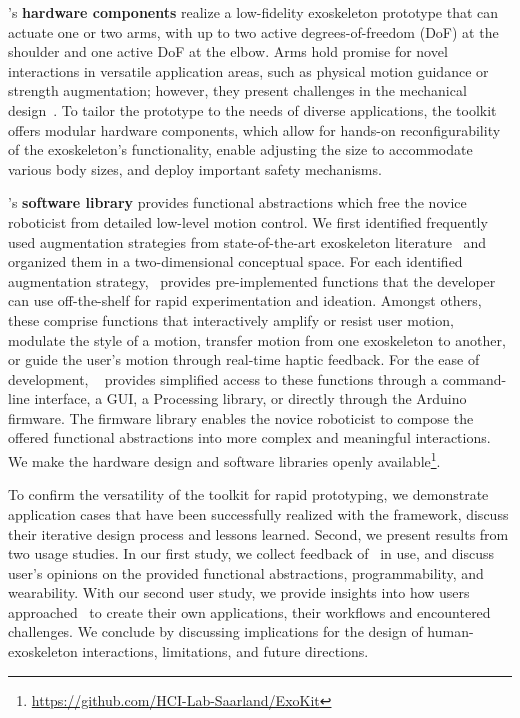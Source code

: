 \toolkit's \textbf{hardware components} realize a low-fidelity exoskeleton prototype that can actuate one or two arms, with up to two active degrees-of-freedom (DoF) at the shoulder and one active DoF at the elbow. 
Arms hold promise for novel interactions in versatile application areas, such as physical motion guidance or strength augmentation; however, they present challenges in the mechanical design~\cite{tiseni_2019}. 
To tailor the prototype to the needs of diverse applications, the toolkit offers modular hardware components, which allow for hands-on reconfigurability of the exoskeleton's functionality, enable adjusting the size to accommodate various body sizes, and deploy important safety mechanisms.

\toolkit's \textbf{software library} provides functional abstractions which free the novice roboticist from detailed low-level motion control. We first identified frequently used augmentation strategies from state-of-the-art exoskeleton literature~\cite{proietti_2016,gasperina_2021} and organized them in a two-dimensional conceptual space. 
For each identified augmentation strategy, \toolkit~provides pre-implemented functions that the developer can use off-the-shelf for rapid experimentation and ideation. Amongst others, these comprise functions that interactively amplify or resist user motion, modulate the style of a motion, transfer motion from one exoskeleton to another, or guide the user's motion through real-time haptic feedback. For the ease of development, \toolkit~ provides simplified access to these functions through a command-line interface, a GUI, a Processing library, or directly through the Arduino firmware.
The firmware library enables the novice roboticist to compose the offered functional abstractions into more complex and meaningful interactions.
We make the hardware design and software libraries openly available\footnote{\url{https://github.com/HCI-Lab-Saarland/ExoKit}}.

To confirm the versatility of the toolkit for rapid prototyping, we demonstrate application cases that have been successfully realized with the framework, discuss their iterative design process and lessons learned. 
Second, we present results from two usage studies. In our first study, we collect feedback of \toolkit~in use, and discuss user's opinions on the provided functional abstractions, programmability, and wearability. With our second user study, we provide insights into how users approached \toolkit~to create their own applications, their workflows and encountered challenges.
We conclude by discussing implications for the design of human-exoskeleton interactions, limitations, and future directions.


